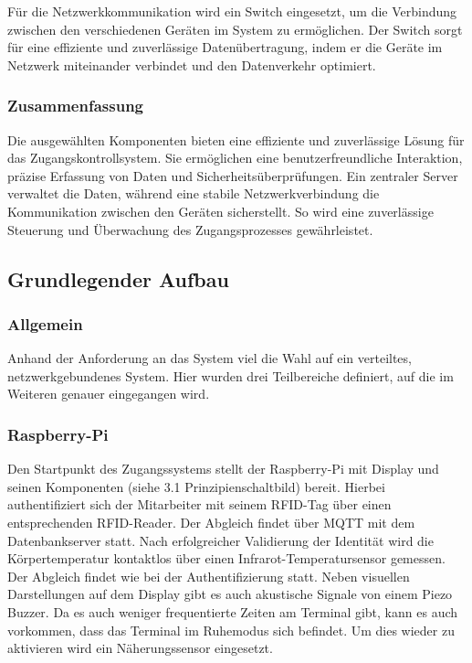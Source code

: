 Für die Netzwerkkommunikation wird ein Switch eingesetzt, um die Verbindung zwischen den verschiedenen Geräten im System zu ermöglichen. Der Switch sorgt für eine effiziente und zuverlässige Datenübertragung, indem er die Geräte im Netzwerk miteinander verbindet und den Datenverkehr optimiert.

\subsubsection{Zusammenfassung}

Die ausgewählten Komponenten bieten eine effiziente und zuverlässige Lösung für das Zugangskontrollsystem. Sie ermöglichen eine benutzerfreundliche Interaktion, präzise Erfassung von Daten und Sicherheitsüberprüfungen. Ein zentraler Server verwaltet die Daten, während eine stabile Netzwerkverbindung die Kommunikation zwischen den Geräten sicherstellt. So wird eine zuverlässige Steuerung und Überwachung des Zugangsprozesses gewährleistet.


\subsection{Grundlegender Aufbau}\label{subsec:grundlegender_aufbau}

\subsubsection{Allgemein}

Anhand der Anforderung an das System viel die Wahl auf ein verteiltes, netzwerkgebundenes System. Hier wurden drei Teilbereiche definiert, auf die im Weiteren genauer eingegangen wird.

\subsubsection{Raspberry-Pi}

Den Startpunkt des Zugangssystems stellt der Raspberry-Pi mit Display und seinen Komponenten (siehe 3.1 Prinzipienschaltbild) bereit. Hierbei authentifiziert sich der Mitarbeiter mit seinem RFID-Tag über einen entsprechenden RFID-Reader. Der Abgleich findet über MQTT mit dem Datenbankserver statt. Nach erfolgreicher Validierung der Identität wird die Körpertemperatur kontaktlos über einen Infrarot-Temperatursensor gemessen. Der Abgleich findet wie bei der Authentifizierung statt. Neben visuellen Darstellungen auf dem Display gibt es auch akustische Signale von einem Piezo Buzzer. Da es auch weniger frequentierte Zeiten am Terminal gibt, kann es auch vorkommen, dass das Terminal im Ruhemodus sich befindet. Um dies wieder zu aktivieren wird ein Näherungssensor eingesetzt.

